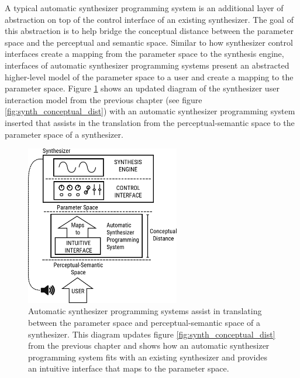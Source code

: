 \label{sec:asp-approaches}
A typical automatic synthesizer programming system is an additional layer of abstraction on top of the control interface of an existing synthesizer. The goal of this abstraction is to help bridge the conceptual distance between the parameter space and the perceptual and semantic space. Similar to how synthesizer control interfaces create a mapping from the parameter space to the synthesis engine, interfaces of automatic synthesizer programming systems present an abstracted higher-level model of the parameter space to a user and create a mapping to the parameter space. Figure \ref{fig:asp_bridge_the_gap} shows an updated diagram of the synthesizer user interaction model from the previous chapter (see figure \ref{fig:synth_conceptual_dist}) with an automatic synthesizer programming system inserted that assists in the translation from the perceptual-semantic space to the parameter space of a synthesizer.


\begin{figure}
    \centering
    \includegraphics[width=0.6\textwidth]{figures/background/asp_bridging_the_gap.png}
    \caption{Automatic synthesizer programming systems assist in translating between the parameter space and perceptual-semantic space of a synthesizer. This diagram updates figure \ref{fig:synth_conceptual_dist} from the previous chapter and shows how an automatic synthesizer programming system fits with an existing synthesizer and provides an intuitive interface that maps to the parameter space.}
    \label{fig:asp_bridge_the_gap}
\end{figure}

